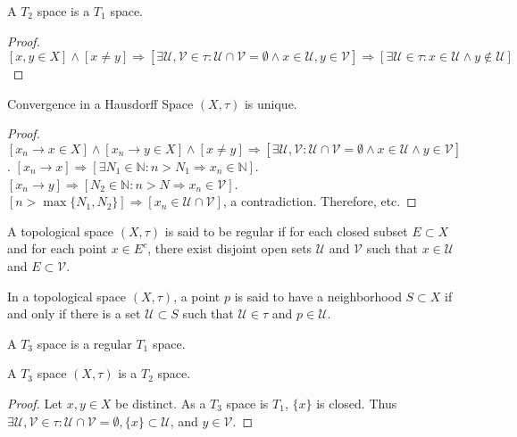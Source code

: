 \documentclass[crop=false,class=book,oneside]{standalone}
\begin{document}
            \begin{theorem}
            A $T_2$ space is a $T_1$ space.
            \end{theorem}
            \begin{proof}
            $[x,y\in X]\land [x\ne y]\Rightarrow [\exists \mathcal{U},\mathcal{V}\in \tau:\mathcal{U}\cap \mathcal{V}=\emptyset\land x\in \mathcal{U},y\in \mathcal{V}]\Rightarrow [\exists \mathcal{U}\in \tau:x\in \mathcal{U}\land y\notin \mathcal{U}]$
            \end{proof}
            \begin{theorem}
            Convergence in a Hausdorff Space $(X,\tau)$ is unique.
            \end{theorem}
            \begin{proof}
            $[x_n \rightarrow x\in X]\land [x_n \rightarrow y\in X]\land[x\ne y]\Rightarrow [\exists \mathcal{U},\mathcal{V}:\mathcal{U}\cap \mathcal{V}=\emptyset\land x\in \mathcal{U}\land y\in \mathcal{V}]$. $[x_n\rightarrow x]\Rightarrow [\exists N_1\in \mathbb{N}:n>N_1\Rightarrow x_n \in \mathbb{N}]$. $[x_n\rightarrow y]\Rightarrow [N_2\in \mathbb{N}:n>N\Rightarrow x_n \in \mathcal{V}]$. $[n>\max\{N_1,N_2\}]\Rightarrow [x_n \in \mathcal{U}\cap \mathcal{V}]$, a contradiction. Therefore, etc.
            \end{proof}
            \begin{definition}
            A topological space $(X,\tau)$ is said to be regular if for each closed subset $E\subset X$ and for each point $x\in E^c$, there exist disjoint open sets $\mathcal{U}$ and $\mathcal{V}$ such that $x\in \mathcal{U}$ and $E\subset \mathcal{V}$.
            \end{definition} 
            \begin{definition}
            In a topological space $(X,\tau)$, a point $p$ is said to have a neighborhood $S\subset X$ if and only if there is a set $\mathcal{U}\subset S$ such that $\mathcal{U}\in \tau$ and $p\in \mathcal{U}$.
            \end{definition}
            \begin{definition}
            A $T_3$ space is a regular $T_1$ space.
            \end{definition}
            \begin{theorem}
            A $T_3$ space $(X,\tau)$ is a $T_2$ space.
            \end{theorem}
            \begin{proof}
            Let $x,y\in X$ be distinct. As a $T_3$ space is $T_1$, $\{x\}$ is closed. Thus $\exists \mathcal{U},\mathcal{V}\in\tau: \mathcal{U}\cap\mathcal{V}=\emptyset, \{x\}\subset \mathcal{U}$, and $y\in \mathcal{V}$.
            \end{proof}
\end{document}
